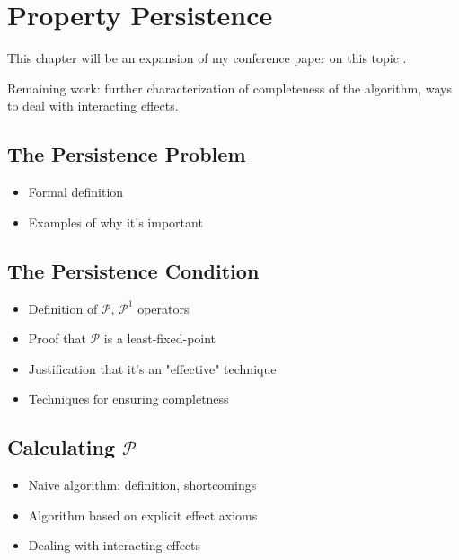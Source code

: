 \chapter{Property Persistence}\label{ch:persistence}

This chapter will be an expansion of my conference paper on this topic \cite{kelly07sc_persistence}.

Remaining work: further characterization of completeness of the algorithm, ways to deal with interacting effects.


\section{The Persistence Problem}

\begin{itemize}
\item Formal definition
\item Examples of why it's important
\end{itemize}

\section{The Persistence Condition}

\begin{itemize}
\item Definition of $\mathcal{P}$, $\mathcal{P}^{1}$ operators
\item Proof that $\mathcal{P}$ is a least-fixed-point
\item Justification that it's an "effective" technique
\item Techniques for ensuring completness
\end{itemize}

\section{Calculating $\mathcal{P}$}

\begin{itemize}
\item Naive algorithm: definition, shortcomings
\item Algorithm based on explicit effect axioms
\item Dealing with interacting effects
\end{itemize}


